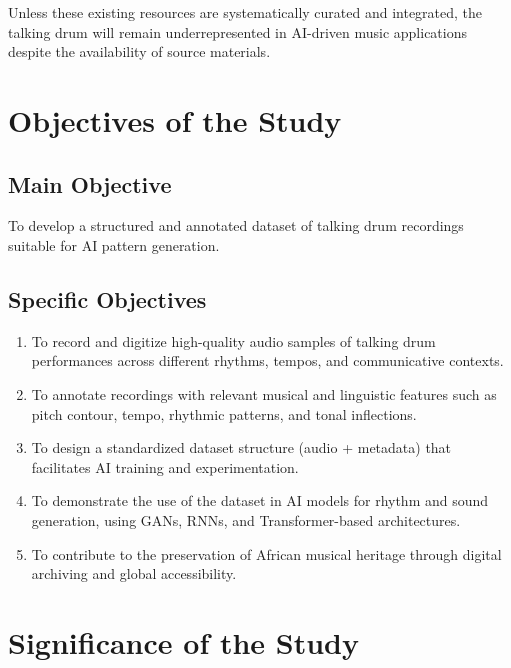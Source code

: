 \documentclass[12pt,a4paper]{article}
\begin{document}
Unless these existing resources are systematically curated and integrated, the talking drum will remain underrepresented in AI-driven music applications despite the availability of source materials.

\section{Objectives of the Study}

\subsection{Main Objective}
To develop a structured and annotated dataset of talking drum recordings suitable for AI pattern generation.

\subsection{Specific Objectives}
\begin{enumerate}
\item To record and digitize high-quality audio samples of talking drum performances across different rhythms, tempos, and communicative contexts.
\item To annotate recordings with relevant musical and linguistic features such as pitch contour, tempo, rhythmic patterns, and tonal inflections.
\item To design a standardized dataset structure (audio + metadata) that facilitates AI training and experimentation.
\item To demonstrate the use of the dataset in AI models for rhythm and sound generation, using GANs, RNNs, and Transformer-based architectures.
\item To contribute to the preservation of African musical heritage through digital archiving and global accessibility.
\end{enumerate}

\section{Significance of the Study}
\end{document}

